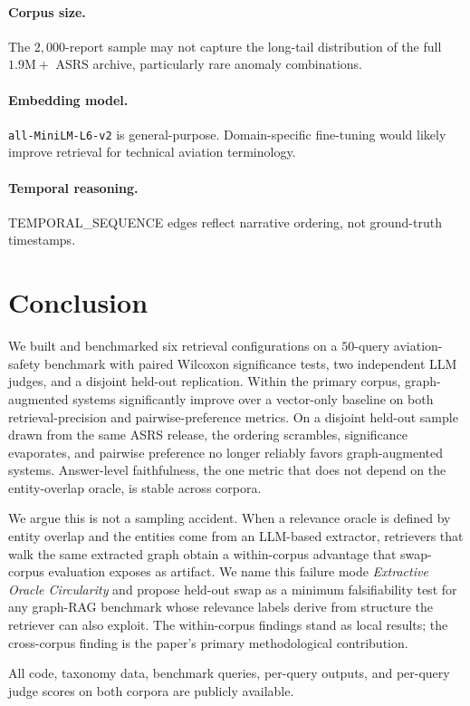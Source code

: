 \documentclass[10pt,a4paper]{article}
\begin{document}
\paragraph{Corpus size.}
The $2{,}000$-report sample may not capture the long-tail
distribution of the full $1.9\text{M}+$ ASRS archive, particularly
rare anomaly combinations.

\paragraph{Embedding model.}
\texttt{all-MiniLM-L6-v2} is general-purpose. Domain-specific
fine-tuning would likely improve retrieval for technical aviation
terminology.

\paragraph{Temporal reasoning.}
\textsc{TEMPORAL\_SEQUENCE} edges reflect narrative ordering, not
ground-truth timestamps.

\section{Conclusion}

We built and benchmarked six retrieval configurations on a
$50$-query aviation-safety benchmark with paired Wilcoxon
significance tests, two independent LLM judges, and a disjoint
held-out replication. Within the primary corpus, graph-augmented
systems significantly improve over a vector-only baseline on both
retrieval-precision and pairwise-preference metrics. On a disjoint
held-out sample drawn from the same ASRS release, the ordering
scrambles, significance evaporates, and pairwise preference no
longer reliably favors graph-augmented systems. Answer-level
faithfulness, the one metric that does not depend on the
entity-overlap oracle, is stable across corpora.

We argue this is not a sampling accident. When a relevance oracle
is defined by entity overlap and the entities come from an
LLM-based extractor, retrievers that walk the same extracted graph
obtain a within-corpus advantage that swap-corpus evaluation
exposes as artifact. We name this failure mode \emph{Extractive
Oracle Circularity} and propose held-out swap as a minimum
falsifiability test for any graph-RAG benchmark whose relevance
labels derive from structure the retriever can also exploit.
The within-corpus findings stand as local results; the cross-corpus
finding is the paper's primary methodological contribution.

All code, taxonomy data, benchmark queries, per-query outputs, and
per-query judge scores on both corpora are publicly available.

{\small


}
\end{document}

